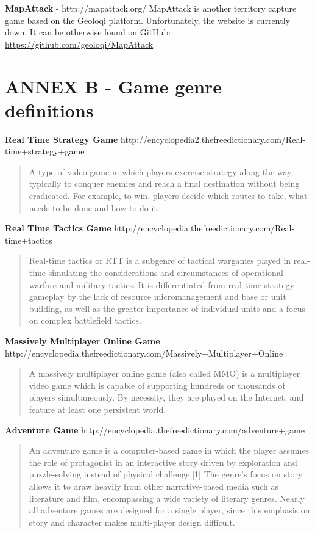\documentclass{article}
\begin{document}
\textbf{MapAttack} - http://mapattack.org/ \newline
MapAttack is another territory capture game based on the Geoloqi platform.
Unfortunately, the website is currently down. It can be otherwise found on GitHub:
\url{https://github.com/geoloqi/MapAttack}\newline


\section{ANNEX B - Game genre definitions}


\textbf{Real Time Strategy Game}		
http://encyclopedia2.thefreedictionary.com/Real-time+strategy+game
\begin{quote}
A type of video game in which players exercise strategy along the way, typically
to conquer enemies and reach a final destination without being eradicated. For
example, to win, players decide which routes to take, what needs to be done and
how to do it.
\end{quote}

\textbf{Real Time Tactics Game}
	http://encyclopedia.thefreedictionary.com/Real-time+tactics
\begin{quote}
Real-time tactics or RTT is a subgenre of tactical wargames played in real-time
simulating the considerations and circumstances of operational warfare and
military tactics. It is differentiated from real-time strategy gameplay by the
lack of resource micromanagement and base or unit building, as well as the
greater importance of individual units and a focus on complex battlefield
tactics.
\end{quote}

\textbf{Massively Multiplayer Online Game}		
	http://encyclopedia.thefreedictionary.com/Massively+Multiplayer+Online
\begin{quote}
A massively multiplayer online game (also called MMO) is a multiplayer video
game which is capable of supporting hundreds or thousands of players
simultaneously. By necessity, they are played on the Internet, and feature at
least one persistent world.
\end{quote}
	
\textbf{Adventure Game}		
	http://encyclopedia.thefreedictionary.com/adventure+game
\begin{quote}
An adventure game is a computer-based game in which the player assumes the role
of protagonist in an interactive story driven by exploration and puzzle-solving
instead of physical challenge.[1] The genre's focus on story allows it to draw
heavily from other narrative-based media such as literature and film,
encompassing a wide variety of literary genres. Nearly all adventure games are
designed for a single player, since this emphasis on story and character makes
multi-player design difficult.
\end{quote}
\end{document}

